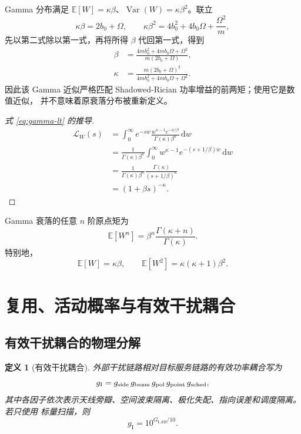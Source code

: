 \documentclass[UTF8,a4paper,11pt]{ctexart}
\newtheorem{definition}{定义}[section]
\newcommand{\E}{\mathbb E}
\newcommand{\Var}{\operatorname{Var}}
\newcommand{\dd}{\,\mathrm d}
\newcommand{\Lcal}{\mathcal L}
\begin{document}
Gamma 分布满足 $\E[W]=\kappa\beta$、$\Var(W)=\kappa\beta^2$。联立
\begin{equation}
 \kappa\beta=2b_0+\Omega,\qquad
 \kappa\beta^2=
 4b_0^2+4b_0\Omega+\frac{\Omega^2}{m},
\end{equation}
先以第二式除以第一式，再将所得 $\beta$ 代回第一式，得到
\begin{align}
 \beta
 &=
 \frac{4mb_0^2+4mb_0\Omega+\Omega^2}
 {m(2b_0+\Omega)},\label{eq:sr-gamma-scale}\\
 \kappa
 &=
 \frac{m(2b_0+\Omega)^2}
 {4mb_0^2+4mb_0\Omega+\Omega^2}.
 \label{eq:sr-gamma-shape}
\end{align}
因此该 Gamma 近似严格匹配 Shadowed-Rician 功率增益的前两矩；使用它是数值近似，
并不意味着原衰落分布被重新定义。

\begin{proof}[式 \eqref{eq:gamma-lt} 的推导]
\begin{equation}
\begin{split}
 \Lcal_W(s)
 &=\int_0^\infty e^{-sw}
 \frac{w^{\kappa-1}e^{-w/\beta}}
 {\Gamma(\kappa)\beta^\kappa}\dd w\\
 &=\frac{1}{\Gamma(\kappa)\beta^\kappa}
 \int_0^\infty
 w^{\kappa-1}e^{-(s+1/\beta)w}\dd w\\
 &=\frac{1}{\Gamma(\kappa)\beta^\kappa}
 \frac{\Gamma(\kappa)}{(s+1/\beta)^\kappa}\\
 &=(1+\beta s)^{-\kappa}.
\end{split}
\end{equation}
\end{proof}

Gamma 衰落的任意 $n$ 阶原点矩为
\begin{equation}
 \E[W^n]
 =\beta^n\frac{\Gamma(\kappa+n)}{\Gamma(\kappa)}.
 \label{eq:gamma-moment}
\end{equation}
特别地，
\begin{equation}
 \E[W]=\kappa\beta,\qquad
 \E[W^2]=\kappa(\kappa+1)\beta^2.
 \label{eq:gamma-first-two}
\end{equation}

\section{复用、活动概率与有效干扰耦合}

\subsection{有效干扰耦合的物理分解}

\begin{definition}[有效干扰耦合]
外部干扰链路相对目标服务链路的有效功率耦合写为
\begin{equation}
 g_{\mathrm I}
 =
 g_{\rm side}\,g_{\rm beam}\,g_{\rm pol}\,g_{\rm point}\,g_{\rm sched},
 \label{eq:gi-decomposition}
\end{equation}
其中各因子依次表示天线旁瓣、空间波束隔离、极化失配、指向误差和调度隔离。若只使用
标量扫描，则
\begin{equation}
 g_{\mathrm I}=10^{G_{\mathrm I,dB}/10}.
 \label{eq:gi-db}
\end{equation}
\end{definition}
\end{document}

